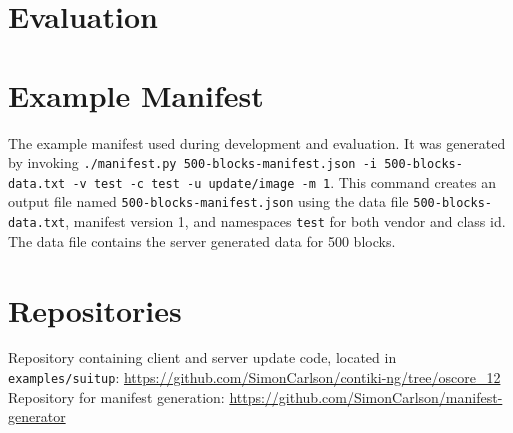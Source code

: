 \documentclass{kththesis}
\begin{document}
\chapter{Evaluation}


\printbibliography[heading=bibintoc] %

\appendix

\chapter{Example Manifest}
\label{app:manifest}
The example manifest used during development and evaluation. It was generated by invoking
\texttt{./manifest.py 500-blocks-manifest.json -i 500-blocks-data.txt -v test -c test -u
update/image -m 1}. This command creates an output file named
\texttt{500-blocks-manifest.json} using the data file \texttt{500-blocks-data.txt},
manifest version 1, and namespaces \texttt{test} for both vendor and class id. The data
file contains the server generated data for 500 blocks.



\chapter{Repositories}
Repository containing client and server update code, located in \texttt{examples/suitup}:
\url{https://github.com/SimonCarlson/contiki-ng/tree/oscore_12}\\

\noindent Repository for manifest generation:
\url{https://github.com/SimonCarlson/manifest-generator}
\end{document}
